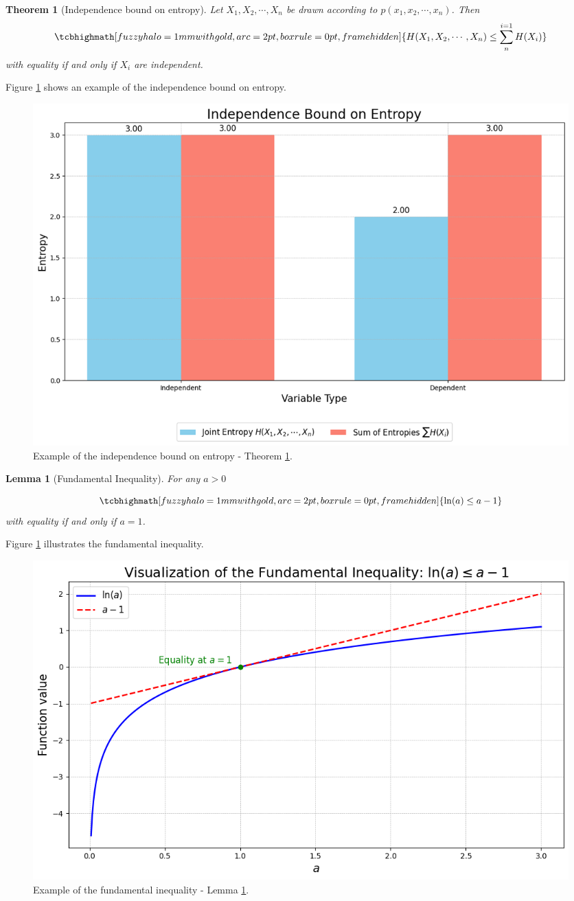 \documentclass[a4paper,10pt]{article}
\newtheorem{theorem}{Theorem}
\newtheorem{lemma}{Lemma}
\newcommand{\equationgold}[1]{
  \tcbhighmath[fuzzy halo=1mm with gold,arc=2pt,boxrule=0pt,frame hidden]{#1}
}
\begin{document}
\begin{theorem}[Independence bound on entropy]\label{theo:ind_bound_entropy}
    Let $X_1, X_2, \cdots, X_n$ be drawn according to $p(x_1, x_2, \cdots, x_n)$. Then 
    \begin{equation}
        \equationgold{
            H(X_1, X_2, \cdots, X_n) \leq \sum_{n}^{i=1}H(X_i)
        }
    \end{equation}
    with equality if and only if $X_i$ are independent.
\end{theorem}

Figure \ref{fig:independence_bound_entropy} shows an example of the independence bound on entropy. 

\begin{figure}[ht]
    \centering
    \includegraphics[width=0.7\linewidth]{Figures/independence_bound_entropy.png}
    \caption{Example of the independence bound on entropy - Theorem \ref{theo:ind_bound_entropy}.}
    \label{fig:independence_bound_entropy}
\end{figure}

\begin{lemma}[Fundamental Inequality]\label{lemma:fundamental_inequality}
    For any $a > 0$ 

    \begin{equation}
        \equationgold{
            \ln(a) \leq a - 1
        }
    \end{equation}
    with equality if and only if $a = 1$.
\end{lemma}

Figure \ref{fig:independence_bound_entropy} illustrates the fundamental inequality. 

\begin{figure}[ht]
    \centering
    \includegraphics[width=0.7\linewidth]{Figures/fundamental_inequality.png}
    \caption{Example of the fundamental inequality - Lemma \ref{lemma:fundamental_inequality}.}
    \label{fig:fundamental_inequality}
\end{figure}
\end{document}
